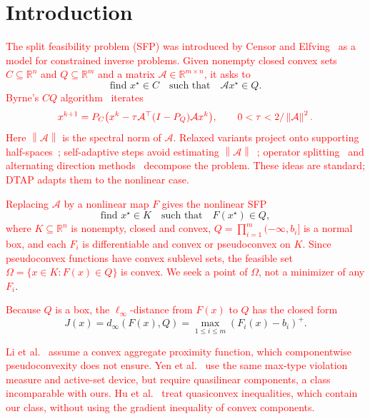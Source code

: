 \documentclass[]{interact}
\theoremstyle{plain}
\theoremstyle{definition}
\theoremstyle{remark}
\newcommand{\R}{\mathbb{R}}
\newcommand{\norm}[1]{\left\lVert #1 \right\rVert}
\begin{document}
\section{Introduction}\label{sec:intro}

\leavevmode\textcolor{red}{The split feasibility problem (SFP) was introduced by Censor and Elfving~\citep{censor1994} as a model for constrained inverse problems. Given nonempty closed convex sets $C\subseteq\R^n$ and $Q\subseteq\R^m$ and a matrix $\mathcal A\in\R^{m\times n}$, it asks to}
\begin{equation}\label{eq:sfp-intro}
\text{find }x^\star\in C\quad\text{such that}\quad\mathcal A x^\star\in Q.
\end{equation}
\leavevmode\textcolor{red}{Byrne's $CQ$ algorithm~\citep{byrne2002} iterates}
\begin{equation}\label{eq:cq-intro}\textcolor{red}{
x^{k+1}=P_C\bigl(x^k-\tau\mathcal A^\top(I-P_Q)\mathcal A x^k\bigr),
\qquad 0<\tau<2/\norm{\mathcal A}^2.
}\end{equation}
\leavevmode\textcolor{red}{Here $\norm{\mathcal A}$ is the spectral norm of $\mathcal A$. Relaxed variants project onto supporting half-spaces~\citep{yang2004}; self-adaptive steps avoid estimating $\norm{\mathcal A}$~\citep{zhang2009adaptive,zhao2011adaptive,lopez2012}; operator splitting~\citep{zhang2012simultaneous} and alternating direction methods~\citep{yang2014alternating} decompose the problem. These ideas are standard; DTAP adapts them to the nonlinear case.}

\leavevmode\textcolor{red}{Replacing $\mathcal A$ by a nonlinear map $F$ gives the nonlinear SFP~\citep{li2013nsfp,yen2019}}
\begin{equation}\label{eq:nsfp-intro}
\text{find }x^\star\in K\quad\text{such that}\quad F(x^\star)\in Q,
\end{equation}
\leavevmode\textcolor{red}{where $K\subseteq\R^n$ is nonempty, closed and convex, $Q=\prod_{i=1}^m(-\infty,b_i]$ is a normal box, and each $F_i$ is differentiable and convex or pseudoconvex on $K$. Since pseudoconvex functions have convex sublevel sets, the feasible set $\Omega=\{x\in K:F(x)\in Q\}$ is convex. We seek a point of $\Omega$, not a minimizer of any $F_i$}.

\leavevmode\textcolor{red}{Because $Q$ is a box, the $\ell_\infty$-distance from $F(x)$ to $Q$ has the closed form}
\[
J(x)=d_\infty(F(x),Q)=\max_{1\le i\le m}(F_i(x)-b_i)^+.
\]

\leavevmode\textcolor{red}{Li et al.~\citep{li2013nsfp} assume a convex aggregate proximity function, which componentwise pseudoconvexity does not ensure. Yen et al.~\citep{yen2019} use the same max-type violation measure and active-set device, but require quasilinear components, a class incomparable with ours. Hu et al.~\citep{hu2022quasi} treat quasiconvex inequalities, which contain our class, without using the gradient inequality of convex components.}
\end{document}
